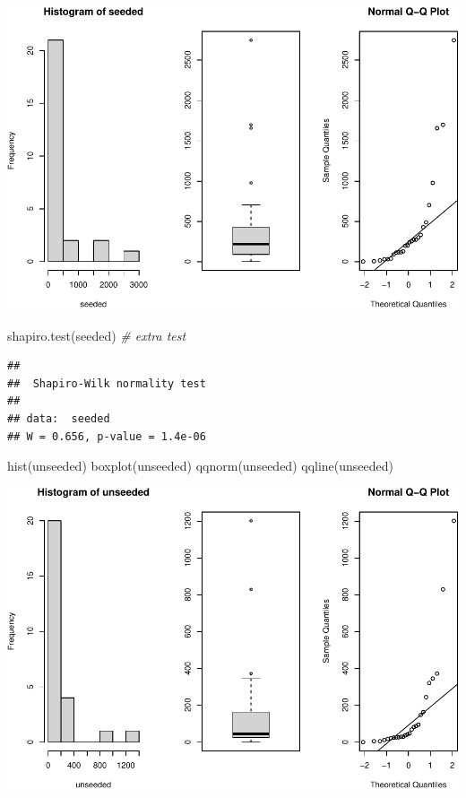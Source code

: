 \documentclass[
]{article}
\newenvironment{Shaded}{\begin{snugshade}}{\end{snugshade}}
\newcommand{\CommentTok}[1]{\textcolor[rgb]{0.56,0.35,0.01}{\textit{#1}}}
\newcommand{\FunctionTok}[1]{\textcolor[rgb]{0.00,0.00,0.00}{#1}}
\newcommand{\NormalTok}[1]{#1}
\begin{document}
\includegraphics{assignment1_group75_final_files/figure-latex/unnamed-chunk-11-1.pdf}

\begin{Shaded}
\begin{Highlighting}[]
\FunctionTok{shapiro.test}\NormalTok{(seeded) }\CommentTok{\# extra test}
\end{Highlighting}
\end{Shaded}

\begin{verbatim}
## 
##  Shapiro-Wilk normality test
## 
## data:  seeded
## W = 0.656, p-value = 1.4e-06
\end{verbatim}

\begin{Shaded}
\begin{Highlighting}[]
\FunctionTok{hist}\NormalTok{(unseeded)}
\FunctionTok{boxplot}\NormalTok{(unseeded)}
\FunctionTok{qqnorm}\NormalTok{(unseeded)}
\FunctionTok{qqline}\NormalTok{(unseeded)}
\end{Highlighting}
\end{Shaded}

\includegraphics{assignment1_group75_final_files/figure-latex/unnamed-chunk-11-2.pdf}
\end{document}

